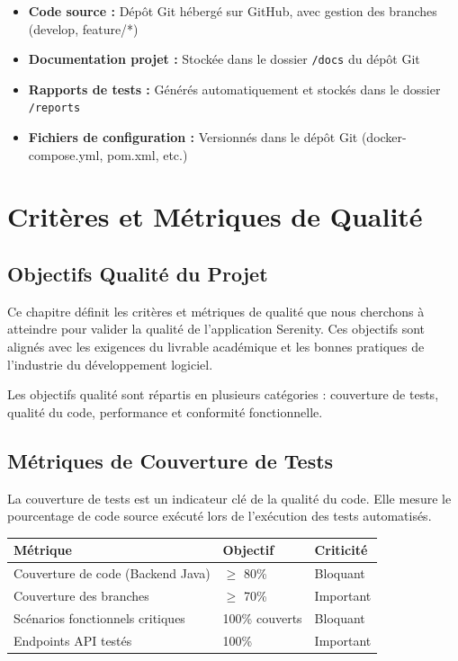 \documentclass[12pt,a4paper]{report}
\begin{document}
\begin{itemize}
    \item \textbf{Code source :} Dépôt Git hébergé sur GitHub, avec gestion des branches (develop, feature/*)
    
    \item \textbf{Documentation projet :} Stockée dans le dossier \texttt{/docs} du dépôt Git
    
    \item \textbf{Rapports de tests :} Générés automatiquement et stockés dans le dossier \texttt{/reports}
    
    \item \textbf{Fichiers de configuration :} Versionnés dans le dépôt Git (docker-compose.yml, pom.xml, etc.)
\end{itemize}

\newpage

\chapter{Critères et Métriques de Qualité}

\section{Objectifs Qualité du Projet}

Ce chapitre définit les critères et métriques de qualité que nous cherchons à atteindre pour valider la qualité de l'application Serenity. Ces objectifs sont alignés avec les exigences du livrable académique et les bonnes pratiques de l'industrie du développement logiciel.

Les objectifs qualité sont répartis en plusieurs catégories : couverture de tests, qualité du code, performance et conformité fonctionnelle.

\section{Métriques de Couverture de Tests}

La couverture de tests est un indicateur clé de la qualité du code. Elle mesure le pourcentage de code source exécuté lors de l'exécution des tests automatisés.

\begin{center}
\begin{tabular}{|l|l|l|}
    \hline
    \textbf{Métrique} & \textbf{Objectif} & \textbf{Criticité} \\
    \hline
    Couverture de code (Backend Java) & $\geq$ 80\% & Bloquant \\
    \hline
    Couverture des branches & $\geq$ 70\% & Important \\
    \hline
    Scénarios fonctionnels critiques & 100\% couverts & Bloquant \\
    \hline
    Endpoints API testés & 100\% & Important \\
    \hline
\end{tabular}
\end{center}
\end{document}
